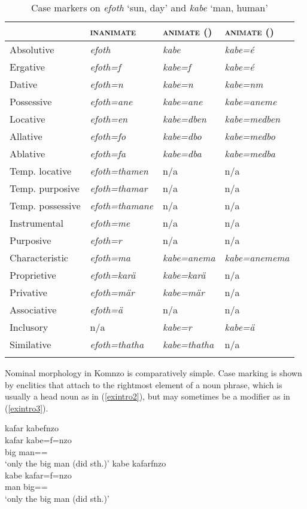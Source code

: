 \begin{table}
\caption{Case markers on \textit{efoth} `sun, day' and \textit{kabe} `man, human'}
\label{tab-01-case}
\centering
	\begin{tabularx}{\textwidth}{Xlll}
	\lsptoprule
		&\textsc{inanimate}&\textsc{animate} (\gl{sg})& \textsc{animate} (\gl{nsg})\\
		\midrule 
		Absolutive&\emph{efoth}&\emph{kabe}&\emph{kabe=é}\\
		Ergative&\emph{efoth=f}&\emph{kabe=f}&\emph{kabe=é}\\
		Dative&\emph{efoth=n}&\emph{kabe=n}&\emph{kabe=nm}\\
		Possessive&\emph{efoth=ane}&\emph{kabe=ane}&\emph{kabe=aneme}\\
		Locative&\emph{efoth=en}&\emph{kabe=dben}&\emph{kabe=medben}\\
		Allative&\emph{efoth=fo}&\emph{kabe=dbo}&\emph{kabe=medbo}\\
		Ablative&\emph{efoth=fa}&\emph{kabe=dba}&\emph{kabe=medba}\\
		Temp. locative&\emph{efoth=thamen}&n/a&n/a\\
		Temp. purposive&\emph{efoth=thamar}&n/a&n/a\\
		Temp. possessive&\emph{efoth=thamane}&n/a&n/a\\
		Instrumental&\emph{efoth=me}&n/a&n/a\\
		Purposive&\emph{efoth=r}&n/a&n/a\\
		Characteristic&\emph{efoth=ma}&\emph{kabe=anema}&\emph{kabe=anemema}\\
		Proprietive&\emph{efoth=karä}&\emph{kabe=karä}&n/a\\
		Privative&\emph{efoth=mär}&\emph{kabe=mär}&n/a\\
		Associative&\emph{efoth=ä}&n/a&n/a\\
		Inclusory&n/a&\emph{kabe=r}&\emph{kabe=ä}\\
		Similative&\emph{efoth=thatha}&\emph{kabe=thatha}&n/a\\
	\lspbottomrule
	\end{tabularx}
\end{table}%

Nominal morphology in Komnzo is comparatively simple. Case marking is shown by enclitics that attach to the rightmost element of a noun phrase, which is usually a head noun as in (\ref{exintro2}), but may sometimes be a modifier as in (\ref{exintro3}).

\ea \label{exintro}
	\ea \label{exintro2}
        kafar kabefnzo\\
        \gll kafar kabe=f=nzo\\
		big man==\\
		\glt `only the big man (did sth.)'
	\ex \label{exintro3}
        kabe kafarfnzo\\
        \gll kabe kafar=f=nzo\\
		man big==\\
		\glt `only the big man (did sth.)'
    \z
\z

